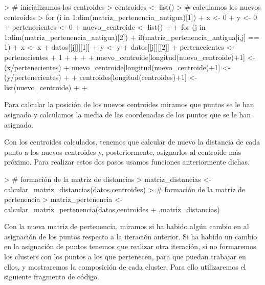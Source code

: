 \documentclass[parskip=full]{scrartcl}
\begin{document}
\begin{itemize}
\begin{itemize}
\begin{Schunk}
\begin{Sinput}
> # inicializamos los centroides
> centroides <- list()
> # calculamos los nuevos centroides
> for (i in 1:dim(matriz_pertenencia_antigua)[1]){
+ x <- 0
+ y <- 0
+ pertenecientes <- 0
+ nuevo_centroide <- list()
+ 
+ for (j in 1:dim(matriz_pertenencia_antigua)[2]){
+     if(matriz_pertenencia_antigua[i,j] == 1){
+     x <- x + datos[[j]][[1]]
+     y <- y + datos[[j]][[2]]
+     pertenecientes <- pertenecientes + 1
+     }
+ }
+ 
+ nuevo_centroide[longitud(nuevo_centroide)+1] <- (x/pertenecientes)
+ nuevo_centroide[longitud(nuevo_centroide)+1] <- (y/pertenecientes)
+ 
+ centroides[longitud(centroides)+1] <- list(nuevo_centroide)
+ 
+ }
\end{Sinput}
\end{Schunk}


    Para calcular la posición de los nuevos centroides miramos que puntos se le han asignado y calculamos la media de las coordenadas de los puntos que se le han asignado. 

    Con los centroides calculados, tenemos que calcular de nuevo la distancia de cada punto a los nuevos centroides y, posteriormente, asignarlos al centroide más próximo. Para realizar estos dos pasos usamos funciones anteriormente dichas.


\begin{Schunk}
\begin{Sinput}
> # formación de la matriz de distancias
> matriz_distancias <- calcular_matriz_distancias(datos,centroides)
> # formación de la matriz de pertenencia
> matriz_pertenencia <- calcular_matriz_pertenencia(datos,centroides
+ ,matriz_distancias)
\end{Sinput}
\end{Schunk}


    Con la nueva matriz de pertenencia, miramos si ha habido algún cambio en al asignación de los puntos respecto a la iteración anterior. Si ha habido un cambio en la asignación de puntos tenemos que realizar otra iteración, si no formaremos los clusters con los puntos a los que pertenecen, para que puedan trabajar en ellos, y mostraremos la composición de cada cluster. Para ello utilizaremos el siguiente fragmento de código.



\end{itemize}
\end{itemize}
\end{document}
